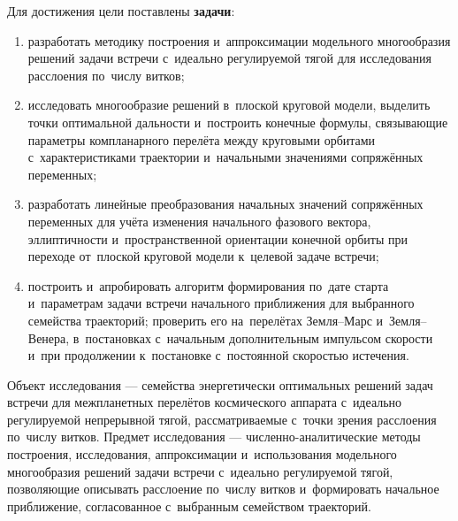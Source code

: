 Для достижения цели поставлены \textbf{задачи}:
\begin{enumerate}[beginpenalty=10000]
    \item разработать методику построения и~аппроксимации модельного многообразия решений задачи встречи с~идеально регулируемой тягой для исследования расслоения по~числу витков;
    \item исследовать многообразие решений в~плоской круговой модели, выделить точки оптимальной дальности и~построить конечные формулы, связывающие параметры компланарного перелёта между круговыми орбитами с~характеристиками траектории и~начальными значениями сопряжённых переменных;
    \item разработать линейные преобразования начальных значений сопряжённых переменных для учёта изменения начального фазового вектора, эллиптичности и~пространственной ориентации конечной орбиты при переходе от~плоской круговой модели к~целевой задаче встречи;
    \item построить и~апробировать алгоритм формирования по~дате старта и~параметрам задачи встречи начального приближения для выбранного семейства траекторий; проверить его на~перелётах Земля--Марс и~Земля--Венера, в~постановках с~начальным дополнительным импульсом скорости и~при продолжении к~постановке с~постоянной скоростью истечения.
\end{enumerate}

Объект исследования --- семейства энергетически оптимальных решений задач встречи для межпланетных перелётов космического аппарата с~идеально регулируемой непрерывной тягой, рассматриваемые с~точки зрения расслоения по~числу витков. Предмет исследования --- численно-аналитические методы построения, исследования, аппроксимации и~использования модельного многообразия решений задачи встречи с~идеально регулируемой тягой, позволяющие описывать расслоение по~числу витков и~формировать начальное приближение, согласованное с~выбранным семейством траекторий.

